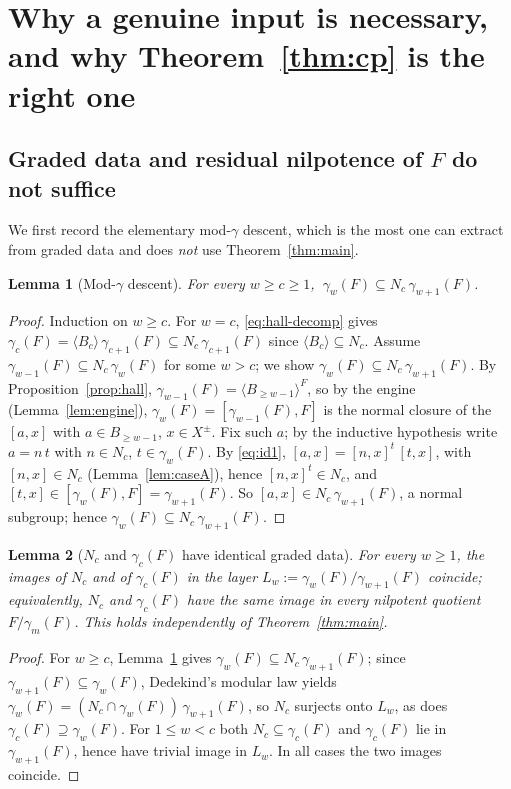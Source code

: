 \documentclass{amsart}
\newtheorem{lemma}{Lemma}
\theoremstyle{definition}
\theoremstyle{remark}
\begin{document}
\section{Why a genuine input is necessary, and why
Theorem~\ref{thm:cp} is the right one}\label{sec:why}

\subsection{Graded data and residual nilpotence of $F$ do not suffice}

We first record the elementary mod-$\gamma$ descent, which is the most one can
extract from graded data and does \emph{not} use Theorem~\ref{thm:main}.

\begin{lemma}[Mod-$\gamma$ descent]\label{lem:moddescent}
For every $w\ge c\ge1$, $\ \gamma_w(F)\subseteq N_c\,\gamma_{w+1}(F)$.
\end{lemma}

\begin{proof}
Induction on $w\ge c$. For $w=c$, \eqref{eq:hall-decomp} gives
$\gamma_c(F)=\langle B_c\rangle\,\gamma_{c+1}(F)\subseteq N_c\,\gamma_{c+1}(F)$
since $\langle B_c\rangle\subseteq N_c$. Assume
$\gamma_{w-1}(F)\subseteq N_c\,\gamma_w(F)$ for some $w>c$; we show
$\gamma_w(F)\subseteq N_c\,\gamma_{w+1}(F)$. By Proposition~\ref{prop:hall},
$\gamma_{w-1}(F)=\langle B_{\ge w-1}\rangle^{F}$, so by the engine
(Lemma~\ref{lem:engine}), $\gamma_w(F)=[\gamma_{w-1}(F),F]$ is the normal closure
of the $[a,x]$ with $a\in B_{\ge w-1}$, $x\in X^{\pm}$. Fix such $a$; by the
inductive hypothesis write $a=n\,t$ with $n\in N_c$, $t\in\gamma_w(F)$. By
\eqref{eq:id1}, $[a,x]=[n,x]^{t}\,[t,x]$, with $[n,x]\in N_c$
(Lemma~\ref{lem:caseA}), hence $[n,x]^{t}\in N_c$, and
$[t,x]\in[\gamma_w(F),F]=\gamma_{w+1}(F)$. So $[a,x]\in N_c\,\gamma_{w+1}(F)$, a
normal subgroup; hence $\gamma_w(F)\subseteq N_c\,\gamma_{w+1}(F)$.
\end{proof}

\begin{lemma}[$N_c$ and $\gamma_c(F)$ have identical graded data]\label{lem:gradedNc}
For every $w\ge1$, the images of $N_c$ and of $\gamma_c(F)$ in the layer
$L_w:=\gamma_w(F)/\gamma_{w+1}(F)$ coincide; equivalently, $N_c$ and $\gamma_c(F)$
have the same image in every nilpotent quotient $F/\gamma_m(F)$. This holds
independently of Theorem~\ref{thm:main}.
\end{lemma}

\begin{proof}
For $w\ge c$, Lemma~\ref{lem:moddescent} gives $\gamma_w(F)\subseteq
N_c\,\gamma_{w+1}(F)$; since $\gamma_{w+1}(F)\subseteq\gamma_w(F)$, Dedekind's
modular law yields $\gamma_w(F)=(N_c\cap\gamma_w(F))\,\gamma_{w+1}(F)$, so $N_c$
surjects onto $L_w$, as does $\gamma_c(F)\supseteq\gamma_w(F)$. For $1\le w<c$ both
$N_c\subseteq\gamma_c(F)$ and $\gamma_c(F)$ lie in $\gamma_{w+1}(F)$, hence have
trivial image in $L_w$. In all cases the two images coincide.
\end{proof}
\end{document}
